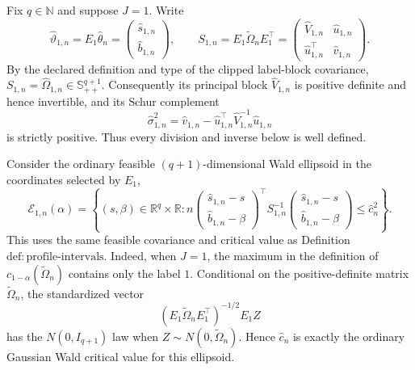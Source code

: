 Fix \(q\in\mathbb N\) and suppose \(J=1\).  Write
\[
 \widehat\vartheta_{1,n}=E_1\widehat\theta_n
   =\begin{pmatrix}\widehat s_{1,n}\\ \widehat b_{1,n}\end{pmatrix},
 \qquad
 S_{1,n}=E_1\widetilde\Omega_nE_1^{\top}
   =\begin{pmatrix}
      \widehat V_{1,n}&\widehat u_{1,n}\\
      \widehat u_{1,n}^{\top}&\widehat v_{1,n}
    \end{pmatrix}.
\]
By the declared definition and type of the clipped label-block covariance, \(S_{1,n}=\widehat\Omega_{1,n}\in\mathbb S_{++}^{q+1}\).  Consequently its principal block \(\widehat V_{1,n}\) is positive definite and hence invertible, and its Schur complement
\[
 \widehat\sigma_{1,n}^{2}
   =\widehat v_{1,n}
     -\widehat u_{1,n}^{\top}\widehat V_{1,n}^{-1}
        \widehat u_{1,n}
\]
is strictly positive.  Thus every division and inverse below is well defined.

Consider the ordinary feasible \((q+1)\)-dimensional Wald ellipsoid in the coordinates selected by \(E_1\),
\[
 \mathcal E_{1,n}(\alpha)
 =\left\{(s,\beta)\in\mathbb R^q\times\mathbb R:
 n\begin{pmatrix}\widehat s_{1,n}-s\\
                   \widehat b_{1,n}-\beta
   \end{pmatrix}^{\!\top}
 S_{1,n}^{-1}
 \begin{pmatrix}\widehat s_{1,n}-s\\
                 \widehat b_{1,n}-\beta
 \end{pmatrix}
 \le \widehat c_n^2\right\}.
\]
This uses the same feasible covariance and critical value as Definition \(\mathrm{def:profile\text{-}intervals}\).  Indeed, when \(J=1\), the maximum in the definition of \(c_{1-\alpha}(\widetilde\Omega_n)\) contains only the label \(1\).  Conditional on the positive-definite matrix \(\widetilde\Omega_n\), the standardized vector
\[
 (E_1\widetilde\Omega_nE_1^{\top})^{-1/2}E_1Z
\]
has the \(N(0,I_{q+1})\) law when \(Z\sim N(0,\widetilde\Omega_n)\).  Hence \(\widehat c_n\) is exactly the ordinary Gaussian Wald critical value for this ellipsoid.

